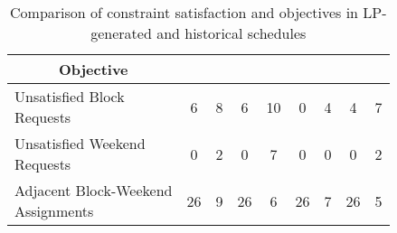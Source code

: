 \begin{table}[htbp]
\begin{tabular}{l|cc|cc|cc|cc}
		\multicolumn{1}{c|}{\textbf{Objective}}             &            &                       &            &                       &            &                       &            &                      \\ \midrule
		\makecell[l]{Unsatisfied Block \\ Requests}         &     6      &           8           &     6      &          10           &     0      &           4           &     4      &          7           \\
		\makecell[l]{Unsatisfied Weekend \\ Requests}       &     0      &           2           &     0      &           7           &     0      &           0           &     0      &          2           \\
		\makecell[l]{Adjacent Block-Weekend \\ Assignments} &     26     &           9           &     26     &           6           &     26     &           7           &     26     &          5
	\end{tabular}%
	\caption{Comparison of constraint satisfaction and objectives in LP-generated and historical schedules}
	\label{tbl:constraints-comparison}%
\end{table}%
